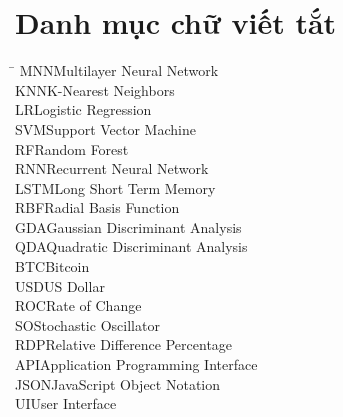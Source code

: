\documentclass[12pt,a4paper]{report}
\begin{document}
 



\tableofcontents
\pagebreak
\listoffigures
\pagebreak 
\listoftables  
\pagebreak

\chapter*{Danh mục chữ viết tắt}
\thispagestyle{plain} 
\begin{tabbing}
\hspace{3cm}\= \kill
MNN\>Multilayer Neural Network\\
KNN\>K-Nearest Neighbors\\
LR\>Logistic Regression\\
SVM\>Support Vector Machine\\
RF\>Random Forest\\
RNN\>Recurrent Neural Network\\
LSTM\>Long Short Term Memory\\
RBF\>Radial Basis Function\\
GDA\>Gaussian Discriminant Analysis\\
QDA\>Quadratic Discriminant Analysis\\
BTC\>Bitcoin\\
USD\>US Dollar\\
ROC\>Rate of Change\\
SO\>Stochastic Oscillator\\
RDP\>Relative Difference Percentage\\
API\>Application Programming Interface\\
JSON\>JavaScript Object Notation\\
UI\>User Interface\\

\end{tabbing}

\pagebreak 


 



 
\end{document}
